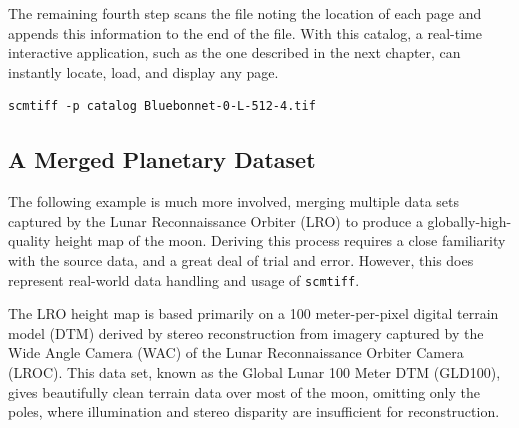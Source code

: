 \documentclass[oneside,10pt]{memoir}
\newcommand{\scmtiff} {\texttt{scmtiff}}
\begin{document}
\begin{Spacing}{1.1}
The remaining fourth step scans the file noting the location of each page and appends this information to the end of the file. With this catalog, a real-time interactive application, such as the one described in the next chapter, can instantly locate, load, and display any page.

\begin{Verbatim}
scmtiff -p catalog Bluebonnet-0-L-512-4.tif
\end{Verbatim}

\subsection{A Merged Planetary Dataset}
\label{sec:planet}

The following example is much more involved, merging multiple data sets captured by the Lunar Reconnaissance Orbiter (LRO) to produce a globally-high-quality height map of the moon. Deriving this process requires a close familiarity with the source data, and a great deal of trial and error. However, this does represent real-world data handling and usage of \scmtiff.

The LRO height map is based primarily on a 100 meter-per-pixel digital terrain model (DTM) derived by stereo reconstruction from imagery captured by the Wide Angle Camera (WAC) of the Lunar Reconnaissance Orbiter Camera (LROC). This data set, known as the Global Lunar 100 Meter DTM (GLD100), gives beautifully clean terrain data over most of the moon, omitting only the poles, where illumination and stereo disparity are insufficient for reconstruction.


\end{Spacing}
\end{document}
